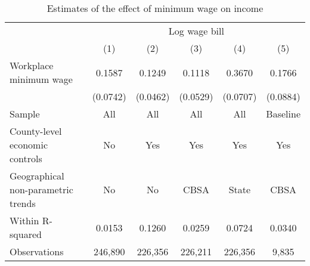 \begin{table}[]
    \caption{Estimates of the effect of minimum wage on income}
    \label{tab:static_wages}

    \begin{tabular}{@{}lccccc@{}}
    \toprule
                                       & \multicolumn{5}{c}{Log wage bill}                         \\ \cmidrule(l){2-6} 
                                       & (1)       & (2)      & (3)      & (4)      & (5)          \\ \midrule
    Workplace minimum wage             & 0.1587    & 0.1249   & 0.1118   & 0.3670      & 0.1766     \\
                                       & (0.0742)  & (0.0462) & (0.0529) & (0.0707)    & (0.0884)   \\ \midrule
    Sample                             & All       & All      & All      & All       & Baseline     \\
    County-level economic controls     & No        & Yes      & Yes      & Yes       & Yes          \\
    Geographical non-parametric trends & No        & No       & CBSA     & State     & CBSA         \\
    Within R-squared                   & 0.0153   & 0.1260   & 0.0259   & 0.0724     & 0.0340        \\
    Observations                       & 246,890   & 226,356  & 226,211  & 226,356    & 9,835       \\ \bottomrule
    \end{tabular}
\end{table}

